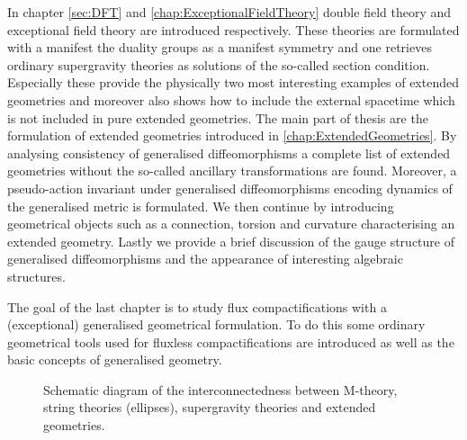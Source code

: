 In chapter \ref{sec:DFT} and \ref{chap:ExceptionalFieldTheory} double field theory and exceptional field theory are introduced respectively. These theories are formulated with a manifest the duality groups as a manifest symmetry and one retrieves ordinary supergravity theories as solutions of the so-called section condition. Especially these provide the physically two most interesting examples of extended geometries and moreover also shows how to include the external spacetime which is not included in pure extended geometries. The main part of thesis are the formulation of extended geometries introduced in \ref{chap:ExtendedGeometries}. By analysing consistency of generalised diffeomorphisms a complete list of extended geometries without the so-called ancillary transformations are found. Moreover, a pseudo-action invariant under generalised diffeomorphisms encoding dynamics of the generalised metric is formulated. We then continue by introducing geometrical objects such as a connection, torsion and curvature characterising an extended geometry. Lastly we provide a brief discussion of the gauge structure of generalised diffeomorphisms and the appearance of interesting algebraic structures. 

The goal of the last chapter is to study flux compactifications with a (exceptional) generalised geometrical formulation. To do this some ordinary geometrical tools used for fluxless compactifications are introduced as well as the basic concepts of generalised geometry. %





\begin{figure}
    \caption{Schematic diagram of the interconnectedness between M-theory, string theories (ellipses), supergravity theories and extended geometries.}
    \label{fig:TheGodFather}
\end{figure}


